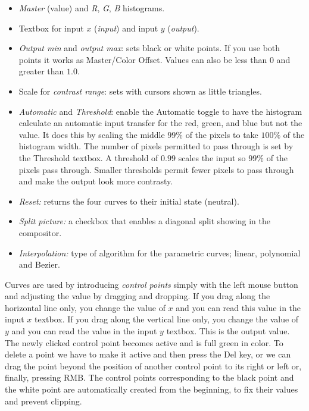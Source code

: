 \begin{itemize}
    \item \textit{Master} (value) and \textit{R}, \textit{G}, \textit{B} histograms.
    \item Textbox for input $x$ (\textit{input}) and input $y$ (\textit{output}).
    \item \textit{Output min} and \textit{output max}: sets black or white points. If you use both points it works as Master/Color
    Offset. Values can also be less than $0$ and greater than $1.0$.
    \item Scale for \textit{contrast range}: sets with cursors shown as little triangles.
    \item \textit{Automatic} and \textit{Threshold}: enable the Automatic toggle to have the histogram calculate an automatic input transfer for the red, green, and blue but not the value. It does this by scaling the middle $99\%$ of the pixels to take $100\%$ of the histogram width. The number of pixels permitted to pass through is set by the Threshold textbox. A threshold of $0.99$ scales the input so $99\%$ of the pixels pass through. Smaller thresholds permit fewer pixels to pass through and make the output look more contrasty.
    \item \textit{Reset:} returns the four curves to their initial state (neutral).
    \item \textit{Split picture:} a checkbox that enables a diagonal split showing in the compositor.
    \item \textit{Interpolation:} type of algorithm for the parametric curves; linear, polynomial and Bezier.
\end{itemize}

Curves are used by introducing \textit{control points} simply with the left mouse button and adjusting the value by dragging and dropping. If you drag along the horizontal line only, you change the value of $x$ and you can read this value in the input $x$ textbox. If you drag along the vertical line only, you change the value of $y$ and you can read the value in the input $y$ textbox. This is the output value. The newly clicked control point becomes active and is full green in color. To delete a point we have to make it active and then press the Del key, or we can drag the point beyond the position of another control point to its right or left or, finally, pressing RMB. The control points corresponding to the black point and the white point are automatically created from the beginning, to fix their values and prevent clipping.


